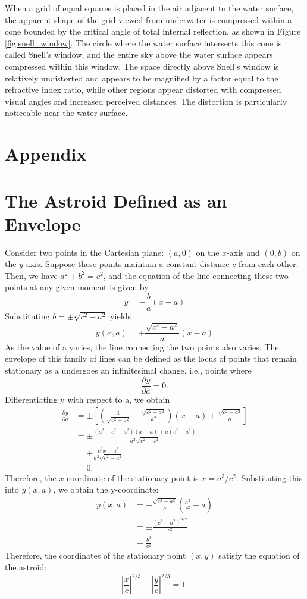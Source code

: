 \documentclass[twocolumn]{article}
\begin{document}
When a grid of equal squares is placed in the air adjacent to the water surface, the apparent shape of the grid viewed from underwater is compressed within a cone bounded by the critical angle of total internal reflection, as shown in Figure \ref{fig:snell_window}. The circle where the water surface intersects this cone is called Snell's window, and the entire sky above the water surface appears compressed within this window. The space directly above Snell's window is relatively undistorted and appears to be magnified by a factor equal to the refractive index ratio, while other regions appear distorted with compressed visual angles and increased perceived distances. The distortion is particularly noticeable near the water surface.



\appendix
\section*{Appendix}
\section{The Astroid Defined as an Envelope} \label{app:astroid}
Consider two points in the Cartesian plane: $(a, 0)$ on the $x$-axis and $(0, b)$ on the $y$-axis. Suppose these points maintain a constant distance $c$ from each other. Then, we have $a^2 + b^2 = c^2$, and the equation of the line connecting these two points at any given moment is given by
$$y = -\frac{b}{a}(x-a)$$
Substituting $b = \pm \sqrt{c^2 - a^2}$ yields
$$y(x, a) = \mp \frac{\sqrt{c^2 - a^2}}{a}(x-a)$$
As the value of a varies, the line connecting the two points also varies. The envelope of this family of lines can be defined as the locus of points that remain stationary as a undergoes an infinitesimal change, i.e., points where
$$\frac{\partial y}{\partial a} = 0.$$
Differentiating y with respect to a, we obtain
$$
\begin{aligned}
	\frac{\partial y}{\partial a} &= \pm\left[\left( \frac{1}{\sqrt{c^2-a^2}}+\frac{\sqrt{c^2-a^2}}{a^2}\right) (x-a) + \frac{\sqrt{c^2-a^2}}{a} \right]\\
	&= \pm \frac{(a^2+c^2-a^2)(x-a)+a(c^2-a^2)}{a^2\sqrt{c^2-a^2}}\\
	&= \pm \frac{c^2 x - a^3}{a^2 \sqrt{c^2 - a^2}}\\
	&= 0.
\end{aligned}
$$
Therefore, the $x$-coordinate of the stationary point is $x = a^3/c^2$. Substituting this into $y(x, a)$, we obtain the y-coordinate:
$$
\begin{aligned}
	y(x, a) &= \mp \frac{\sqrt{c^2-a^2}}{a}\left(\frac{a^3}{c^2}-a\right)\\
	& = \pm \frac{\left( c^2- a^2 \right)^{3/2}}{c^2}\\
	& = \frac{b^3}{c^2}
\end{aligned}
$$
Therefore, the coordinates of the stationary point $(x, y)$ satisfy the equation of the astroid:
$$ \left|\dfrac{x}{c}\right|^{2/3} + \left|\dfrac{y}{c}\right|^{2/3} = 1. $$
\end{document}
